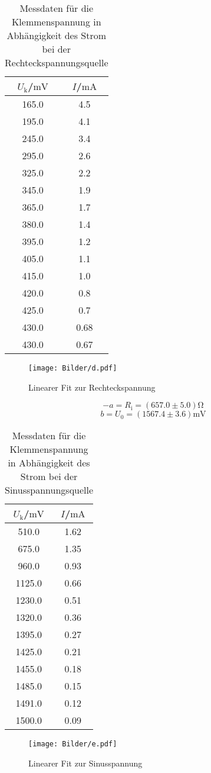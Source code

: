 \begin{table}
  \centering
  \label{tab:reckteck}
  \caption{Messdaten für die Klemmenspannung in Abhängigkeit des Strom bei der Rechteckspannungsquelle}
\begin{tabular}{cc}
  \toprule
$U_\text{k}$/$\si{\milli\volt}$ & $I$/$\si{\milli\ampere}$\\
\midrule
165.0 & 4.5 \\
195.0 & 4.1 \\
245.0 & 3.4 \\
295.0 & 2.6 \\
325.0 & 2.2 \\
345.0 & 1.9 \\
365.0 & 1.7 \\
380.0 & 1.4 \\
395.0 & 1.2 \\
405.0 & 1.1 \\
415.0 & 1.0 \\
420.0 & 0.8 \\
425.0 & 0.7 \\
430.0 & 0.68 \\
430.0 & 0.67 \\
\bottomrule
\end{tabular}
\end{table}
\begin{figure}
\texttt{[image: Bilder/d.pdf]}
\caption{Linearer Fit zur Rechteckspannung}
\label{fig:plot_rechteck}
\end{figure}



\begin{equation*}
  -a= R_\text{i}=(657.0± 5.0)\si{\ohm}
\end{equation*}
\begin{equation*}
  b =U_\text{0}=(1567.4\pm3.6)\si{\milli\volt}
\end{equation*}

\begin{table}
  \centering
  \label{tab:sinus}
  \caption{Messdaten für die Klemmenspannung in Abhängigkeit des Strom bei der Sinusspannungsquelle}
\begin{tabular}{cc}
  \toprule
$U_\text{k}$/$\si{\milli\volt}$ & $I$/$\si{\milli\ampere}$\\
\midrule
510.0 & 1.62 \\
675.0 & 1.35 \\
960.0 & 0.93 \\
1125.0 & 0.66 \\
1230.0 & 0.51 \\
1320.0 & 0.36 \\
1395.0 & 0.27 \\
1425.0 & 0.21 \\
1455.0 & 0.18 \\
1485.0 & 0.15 \\
1491.0 & 0.12 \\
1500.0 & 0.09 \\
\bottomrule
\end{tabular}
\end{table}
\begin{figure}
\texttt{[image: Bilder/e.pdf]}
\caption{Linearer Fit zur Sinusspannung}
\label{fig:plot_sinus}
\end{figure}
